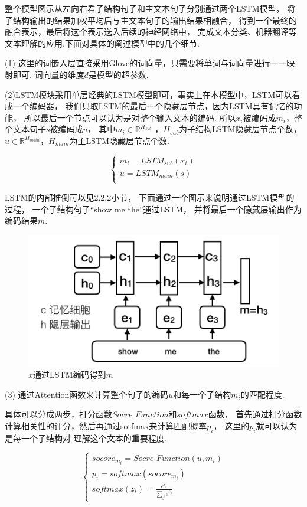 \documentclass[bachelor,adobefonts]{jnuthesis}
\begin{document}
整个模型图示从左向右看子结构句子和主文本句子分别通过两个LSTM模型，
将子结构输出的结果加权平均后与主文本句子的输出结果相融合，
得到一个最终的融合表示，最后将这个表示送入后续的神经网络中，
完成文本分类、机器翻译等文本理解的应用.下面对具体的阐述模型中的几个细节.

(1) 这里的词嵌入层直接采用Glove的词向量，只需要将单词与词向量进行一一映射即可.
词向量的维度$d$是模型的超参数.

(2)LSTM模块采用单层经典的LSTM模型即可，事实上在本模型中，LSTM可以看成一个编码器，
我们只取LSTM的最后一个隐藏层节点，因为LSTM具有记忆的功能，
所以最后一个节点可以认为是对整个输入文本的编码.
所以$x_{i}$被编码成$m_{i}$，整个文本句子$s$被编码成$u$，
其中$m_{i} \in \mathbb{R}^{H_{sub}}$ ，$H_{sub}$为子结构LSTM隐藏层节点个数，
$u \in \mathbb{R}^{H_{main}}$，$H_{main}$为主LSTM隐藏层节点个数.

\begin{equation}
\left\{
  \begin{array}{l}
   m_{i} = LSTM_{sub}(x_{i}) \\ 
   u = LSTM_{main}(s) \\ 
  \end{array}
  \right.
\end{equation}

LSTM的内部推倒可以见2.2.2小节，
下面通过一个图示来说明通过LSTM模型的过程，
一个子结构句子“show me the”通过LSTM，
并将最后一个隐藏层输出作为编码结果$m$.

\begin{figure}[h!]
  \centering
  \includegraphics[width=0.5\linewidth]{LSTMjuti.png}
  \caption{$x$通过LSTM编码得到$m$}
\end{figure}

(3)
通过Attention函数来计算整个句子的编码$u$和每一个子结构$m_{i}$的匹配程度.

具体可以分成两步，打分函数$Socre\_Function$和$softmax$函数，
首先通过打分函数计算相关性的评分，然后再通过sotfmax来计算匹配概率$p_{i}$，
这里的$p_{i}$就可以认为是每一个子结构对
理解这个文本的重要程度.

\begin{equation}
  \left\{
    \begin{array}{l}
     socore_{m_{i}} = Socre\_Function(u,m_{i}) \\ 
     p_{i} = softmax(socore_{m_{i}}) \\ 
     softmax(z_{i}) = \frac{e^{z_{i}}}{\sum_{j} e^{z_{j}}}
    \end{array}
  \right.
\end{equation}
\end{document}
